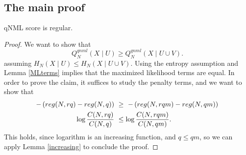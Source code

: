 \subsection{The main proof}
\begin{theorem}
qNML score is regular.
\end{theorem}
\begin{proof}
We want to show that
$$
Q^{qnml}_N(X\mid U) \geq Q^{qnml}_N(X \mid U \cup V).
$$assuming $H_N(X \mid U) \leq H_N(X \mid U \cup V)$. Using the entropy assumption and Lemma \ref{MLterms} implies that the maximized likelihood terms are equal. In order to prove the claim, it suffices to study the penalty terms, and we want to show that
\begin{align*}
- \left( reg(N,rq) - reg(N,q) \right) \ &\geq \  -\left( reg(N,rqm) - reg(N,qm) \right) \\
\log \frac{C(N,rq)}{C(N,q)} \ &\leq \log \frac{C(N,rqm)}{C(N,qm)}.
\end{align*}This holds, since logarithm is an increasing function, and $q \leq qm$, so we can apply Lemma \ref{increasing} to conclude the proof. 


\end{proof}


